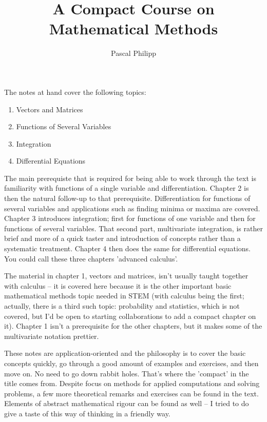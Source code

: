\documentclass[12pt,a4paper]{report}
\title{A Compact Course on Mathematical Methods}
\author{Pascal Philipp}
\theoremstyle{definition}
\begin{document}
\maketitle

\noindent
The notes at hand cover the following topics:

\begin{enumerate}
\item Vectors and Matrices
\item Functions of Several Variables
\item Integration
\item Differential Equations
\end{enumerate}

The main prerequiste that is required for being able to work through the
text is familiarity with functions of a single variable and differentiation.
Chapter 2 is then the natural follow-up to that prerequisite.
Differentiation for functions of several variables and applications
such as finding minima or maxima are covered.
Chapter 3 introduces integration; first for functions of one variable and then
for functions of several variables.
That second part, multivariate integration, is rather brief and more of a
quick taster and introduction of concepts rather than a systematic treatment.
Chapter 4 then does the same for differential equations.
You could call these three chapters 'advanced calculus'.

The material in chapter 1, vectors and matrices, isn't usually taught together
with calculus -- it is covered here because it is the other important basic
mathematical methods topic needed in STEM
(with calculus being the first; actually, there is a third such topic:
probability and statistics, which is not covered, but I'd be open to starting
collaborations to add a compact chapter on it).
Chapter 1 isn't a prerequisite for the other chapters, but it makes some of
the multivariate notation prettier.

These notes are application-oriented and the philosophy is to
cover the basic concepts quickly, go through a good amount of examples and
exercises, and then move on. No need to go down rabbit holes.
That's where the 'compact' in the title comes from.
Despite focus on methods for applied computations and solving problems,
a few more theoretical remarks and exercises can be found in the text.
Elements of abstract mathematical rigour can be found as well -- I tried to
do give a taste of this way of thinking in a friendly way.
\end{document}
